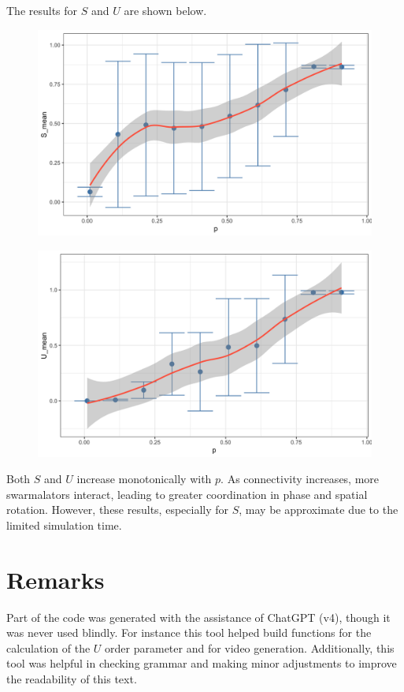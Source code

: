The results for $S$ and $U$ are shown below.

\begin{figure}[h]
    \centering
    \begin{minipage}[c]{0.8\textwidth}
        \includegraphics[width=\textwidth]{images/task2/S_K=-0.6,J=0.9.png}
    \end{minipage}
    \label{fig:S}
\end{figure}

\begin{figure}[h]
    \centering
    \begin{minipage}[c]{0.8\textwidth}
        \includegraphics[width=\textwidth]{images/task2/U_K=-0.6,J=0.9.png}
    \end{minipage}
    \label{fig:U}
\end{figure}

Both $S$ and $U$ increase monotonically with $p$. As connectivity increases, more swarmalators interact, leading to greater coordination in phase and spatial rotation. However, these results, especially for $S$, may be approximate due to the limited simulation time.

\chapter*{Remarks}
Part of the code was generated with the assistance of ChatGPT (v4), though it was never used blindly. For instance this tool helped build functions for the calculation of the \( U \) order parameter and for video generation. Additionally, this tool was helpful in checking grammar and making minor adjustments to improve the readability of this text.
